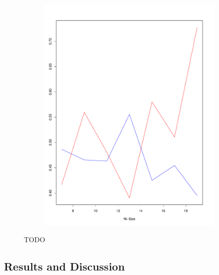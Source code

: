 \documentclass{itatnew}
\begin{document}
\begin{figure}[htp]
\begin{subfigure}{\linewidth}
    \includegraphics[width=\linewidth]{images/SoHDownBlur}
    \label{fig:DownwardBlur}
  \end{subfigure}
  \caption{TODO}
  \label{fig:Blur}
\end{figure}


\subsection{Results and Discussion}
\end{document}
